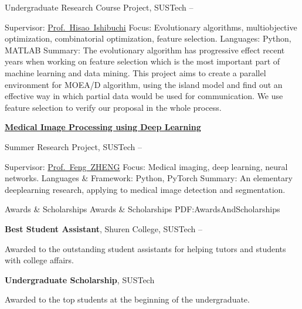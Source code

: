 \documentclass[a4paper,MMMyyyy,nonstopmode]{simpleresumecv}
\begin{document}
\begin{Body}
\BulletItem
Undergraduate Research Course Project, SUSTech
\hfill
{} --
\begin{Detail}
\SubBulletItem
Supervisor:
\href{http://cse.sustech.edu.cn/faculty/~hisao/}{Prof.~Hisao~Ishibuchi}
\SubBulletItem
Focus:
Evolutionary algorithms, multiobjective optimization, combinatorial optimization, feature selection.
\SubBulletItem
Languages: Python, MATLAB
\SubBulletItem
Summary:
The evolutionary algorithm has progressive effect recent years when working on feature selection which is the most important part of machine learning and data mining. This project aims to create a parallel environment for MOEA/D algorithm, using the island model and find out an effective way in which partial data would be used for communication. We use feature selection to verify our proposal in the whole process.
\end{Detail}

\Gap
\Entry
\href{https://github.com/hackroid/cv-xmp}
{\textbf{Medical Image Processing using Deep Learning}}

\BulletItem
Summer Research Project, SUSTech
\hfill
{} --
\begin{Detail}
\SubBulletItem
Supervisor:
\href{https://faculty.sustech.edu.cn/fengzheng/en/}{Prof.~Feng~ZHENG}
\SubBulletItem
Focus:
Medical imaging, deep learning, neural networks.
\SubBulletItem
Languages \& Framework: Python, PyTorch
\SubBulletItem
Summary:
An elementary deeplearning research, applying to medical image detection and segmentation.
\end{Detail}



\Section
{Awards \&\newline
Scholarships}
{Awards \& Scholarships}
{PDF:AwardsAndScholarships}

\BulletItem
\textbf{Best Student Assistant},
Shuren College,
SUSTech
\hfill
{} --
\begin{Detail}
\Item
Awarded to the outstanding student assistants for helping tutors and students with college affairs.
\end{Detail}

\Gap
\BulletItem
\textbf{Undergraduate Scholarship},
SUSTech
\hfill
{}
\begin{Detail}
\Item
Awarded to the top students at the beginning of the undergraduate.
\end{Detail}



\end{Body}
\end{document}
